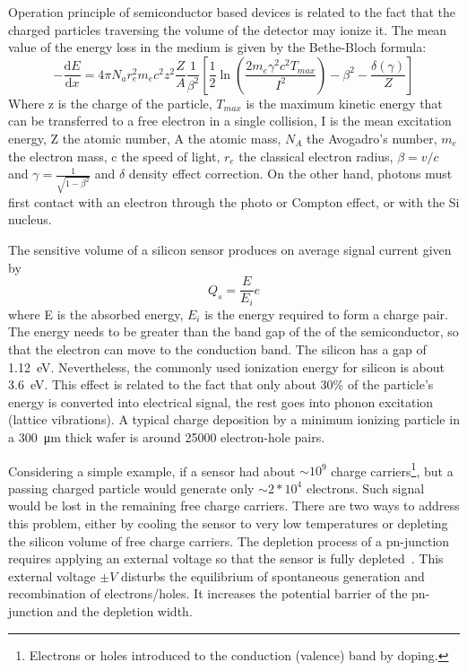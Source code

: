 Operation principle of semiconductor based devices is related to the fact that the charged particles traversing the volume of the detector may ionize it. The mean value of the energy loss in the medium is given by the Bethe-Bloch formula:
\begin{equation}
-\dfrac{\mathrm dE}{\mathrm dx} = 4 \pi N_{a} r_{e}^{2} m_{e} c^{2} z^{2}  \dfrac{Z}{A} \frac{1}{\beta^{2}} \left[ \frac{1}{2}\ln(\frac{2m_{e}\gamma^{2}c^{2} T_{max}}{I^{2}}) - \beta^{2} -  \frac{\delta(\gamma)}{Z}\right]
\end{equation}
Where z is the charge of the particle, $T_{max}$ is the maximum kinetic energy that can be transferred to a free electron in a single collision, I is the mean excitation energy, Z the atomic number, A the atomic mass, $N_{A}$ the Avogadro’s number, $m_{e}$ the electron mass, c the speed of light, $r_{e}$ the classical electron radius, $\beta = v/c$ and $\gamma = \frac{1}{\sqrt{1-\beta^{2}}}$ and $\delta$ density effect correction. On the other hand, photons must first contact with an electron through the photo or Compton effect, or with the Si nucleus. 

The sensitive volume of a silicon sensor produces on average signal current given by 
\begin{equation}
    Q_{s} = \frac{E}{E_{i}}e
\end{equation}
where E is the absorbed energy, $E_{i}$ is the energy required to form a charge pair. The energy needs to be greater than the band gap of the of the semiconductor, so that the electron can move to the conduction band. The silicon has a gap of 1.12~eV. Nevertheless, the commonly used ionization energy for silicon is about 3.6~eV. This effect is related to the fact that only about 30\% of the particle's energy is converted into electrical signal, the rest goes into phonon excitation (lattice vibrations). A typical charge deposition by a minimum ionizing particle in a \SI{300}{\micro\metre} thick wafer is around 25000 electron-hole pairs.

Considering a simple example, if a sensor had about $\sim10^{9}$ charge carriers\footnote{Electrons or holes introduced to the conduction (valence) band by doping.}, but a passing charged particle would generate only $\sim2*10^{4}$ electrons. Such signal would be lost in the remaining free charge carriers. There are two ways to address this problem, either by cooling the sensor to very low temperatures or depleting the silicon volume of free charge carriers. The depletion process of a pn-junction requires applying an external voltage so that the sensor is fully depleted~\cite{Spieler}. This external voltage $\pm V$ disturbs the equilibrium of spontaneous generation and recombination of electrons/holes. It increases the potential barrier of the pn-junction and the depletion width. 

